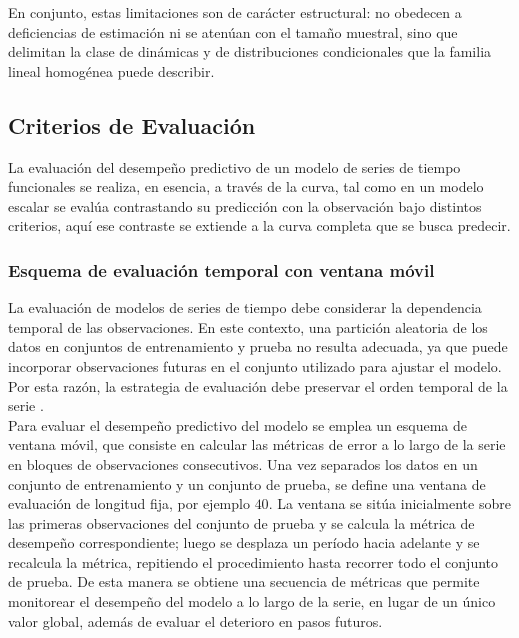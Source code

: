 En conjunto, estas limitaciones son de carácter estructural: no obedecen a deficiencias de estimación ni se atenúan con el tamaño muestral, sino que delimitan la clase de dinámicas y de distribuciones condicionales que la familia lineal homogénea puede describir.

\subsection{Criterios de Evaluación}
\label{02_02_03_criterios_evaluacion}
La evaluación del desempeño predictivo de un modelo de series de tiempo funcionales se realiza, en esencia, a través de la curva, tal como en un modelo escalar se evalúa contrastando su predicción con la observación bajo distintos criterios, aquí ese contraste se extiende a la curva completa que se busca predecir.  

\subsubsection{Esquema de evaluación temporal con ventana móvil}
\label{02_02_03_01_esquema_evaluacion}

La evaluación de modelos de series de tiempo debe considerar la dependencia temporal de las observaciones. En este contexto, una partición aleatoria de los datos en conjuntos de entrenamiento y prueba no resulta adecuada, ya que puede incorporar observaciones futuras en el conjunto utilizado para ajustar el modelo. Por esta razón, la estrategia de evaluación debe preservar el orden temporal de la serie \cite{02_02_bergmeir2012crossvalidation}.\\

Para evaluar el desempeño predictivo del modelo se emplea un esquema de ventana móvil, que consiste en calcular las métricas de error a lo largo de la serie en bloques de observaciones consecutivos. Una vez separados los datos en un conjunto de entrenamiento y un conjunto de prueba, se define una ventana de evaluación de longitud fija, por ejemplo $40$. La ventana se sitúa inicialmente sobre las primeras observaciones del conjunto de prueba y se calcula la métrica de desempeño correspondiente; luego se desplaza un período hacia adelante y se recalcula la métrica, repitiendo el procedimiento hasta recorrer todo el conjunto de prueba. De esta manera se obtiene una secuencia de métricas que permite monitorear el desempeño del modelo a lo largo de la serie, en lugar de un único valor global, además de evaluar el deterioro en pasos futuros.

